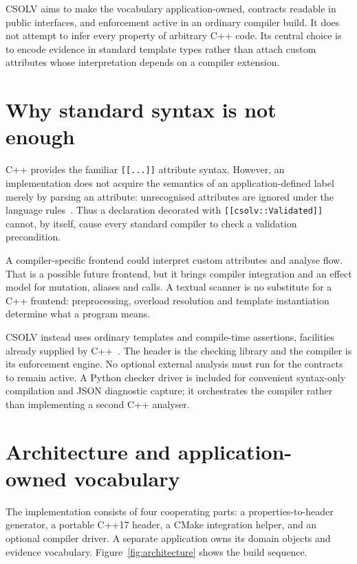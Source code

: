 \documentclass[11pt]{article}
\newcommand{\csolv}{\textsc{CSOLV}}
\begin{document}
\csolv{} aims to make the vocabulary application-owned, contracts readable in
public interfaces, and enforcement active in an ordinary compiler build. It
does not attempt to infer every property of arbitrary C++ code. Its central
choice is to encode evidence in standard template types rather than attach
custom attributes whose interpretation depends on a compiler extension.

\section{Why standard syntax is not enough}
C++ provides the familiar \texttt{[[...]]} attribute syntax. However, an
implementation does not acquire the semantics of an application-defined label
merely by parsing an attribute: unrecognised attributes are ignored under the
language rules~\cite{attributes}. Thus a declaration decorated with
\texttt{[[csolv::Validated]]} cannot, by itself, cause every standard compiler
to check a validation precondition.

A compiler-specific frontend could interpret custom attributes and analyse
flow. That is a possible future frontend, but it brings compiler integration
and an effect model for mutation, aliases and calls. A textual scanner is no
substitute for a C++ frontend: preprocessing, overload resolution and template
instantiation determine what a program means.

\csolv{} instead uses ordinary templates and compile-time assertions, facilities
already supplied by C++~\cite{templates,assertions}. The header is the checking
library and the compiler is its enforcement engine. No optional external
analysis must run for the contracts to remain active. A Python checker driver
is included for convenient syntax-only compilation and JSON diagnostic capture;
it orchestrates the compiler rather than implementing a second C++ analyser.

\section{Architecture and application-owned vocabulary}
The implementation consists of four cooperating parts: a properties-to-header
generator, a portable C++17 header, a CMake integration helper, and an optional
compiler driver. A separate application owns its domain objects and evidence
vocabulary. Figure~\ref{fig:architecture} shows the build sequence.
\end{document}
